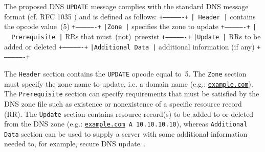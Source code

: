 The proposed DNS \texttt{UPDATE} message complies with the standard DNS message format (cf. RFC 1035 \cite{rfc1035}) and is defined as follows:
\newline
\noindent
       \texttt{+----------------+}
      \newline \noindent
       \texttt{|\hspace{0.85cm} Header\hspace{0.85cm} |} contains the opcode value~(5)
      \noindent \texttt{+----------------+}
      \newline \noindent
      \texttt{|\hspace{1.16cm}Zone\hspace{1.16cm} |} specifies the zone to update
      \texttt{+----------------+}
      \newline \noindent
      \texttt{|~\hspace{0.115cm}~Prerequisite\hspace{0.115cm} |} RRs that must~(not)~preexist
      \texttt{+----------------+}
      \newline \noindent
      \texttt{|\hspace{0.95cm}Update\hspace{0.95cm} |} RRs to be added or deleted
      \texttt{+----------------+}
      \newline \noindent
      \texttt{|\hspace{0.005cm}Additional Data\hspace{-0.005cm} |} additional information (if any)
      \texttt{+----------------+}

The \texttt{Header} section contains the \texttt{UPDATE} opcode equal to~5. The \texttt{Zone} section must specify the zone name to update, i.e. a domain name (e.g.: \texttt{\url{example.com}}). The \texttt{Prerequisite} section can specify 
requirements %
that must be satisfied by the DNS zone file such as existence or nonexistence of a specific resource record (RR). %
The \texttt{Update} section contains resource record(s) to be added to or deleted from the DNS zone (e.g.:  \texttt{\url{example.com} A 10.10.10.10}), whereas \texttt{Additional Data} section can be used to supply a server with some additional information needed to, for example,  secure DNS update~\cite{rfc2136}.

